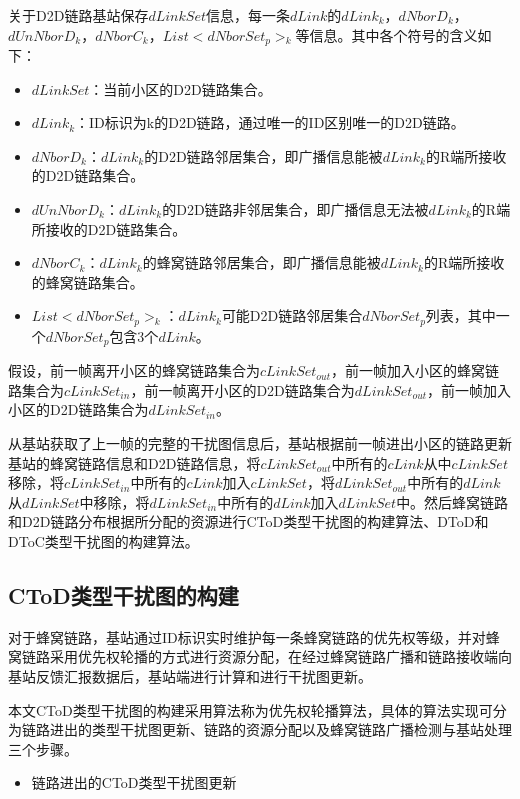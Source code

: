 \documentclass[figurelist,tablelist,algorithmlist,nomlist,masters]{seuthesix}
\begin{document}
	关于D2D链路基站保存$dLinkSet$信息，每一条$dLink$的$dLink_k$，$dNborD_k$，$dUnNborD_k$，$dNborC_k$，$List < dNborSet_{p}{ > _k}$等信息。其中各个符号的含义如下：
	
	\begin{itemize}
		\item $dLinkSet$：当前小区的D2D链路集合。
		\item $dLink_k$：ID标识为k的D2D链路，通过唯一的ID区别唯一的D2D链路。
		\item $dNborD_k$：$dLink_k$的D2D链路邻居集合，即广播信息能被$dLink_k$的R端所接收的D2D链路集合。
		\item $dUnNborD_k$：$dLink_k$的D2D链路非邻居集合，即广播信息无法被$dLink_k$的R端所接收的D2D链路集合。
		\item $dNborC_k$：$dLink_k$的蜂窝链路邻居集合，即广播信息能被$dLink_k$的R端所接收的蜂窝链路集合。
		\item $List < dNborSet_{p}{ > _k}$：$dLink_k$可能D2D链路邻居集合$dNborSet_{p}$列表，其中一个$dNborSet_{p}$包含3个$dLink$。
	\end{itemize}
	
	假设，前一帧离开小区的蜂窝链路集合为$cLinkSet_{out}$，前一帧加入小区的蜂窝链路集合为$cLinkSet_{in}$，前一帧离开小区的D2D链路集合为$dLinkSet_{out}$，前一帧加入小区的D2D链路集合为$dLinkSet_{in}$。
	
	从基站获取了上一帧的完整的干扰图信息后，基站根据前一帧进出小区的链路更新基站的蜂窝链路信息和D2D链路信息，将$cLinkSet_{out}$中所有的$cLink$从中$cLinkSet$移除，将$cLinkSet_{in}$中所有的$cLink$加入$cLinkSet$，将$dLinkSet_{out}$中所有的$dLink$从$dLinkSet$中移除，将$dLinkSet_{in}$中所有的$dLink$加入$dLinkSet$中。然后蜂窝链路和D2D链路分布根据所分配的资源进行CToD类型干扰图的构建算法、DToD和DToC类型干扰图的构建算法。
	
	\subsection{CToD类型干扰图的构建}
	
	对于蜂窝链路，基站通过ID标识实时维护每一条蜂窝链路的优先权等级，并对蜂窝链路采用优先权轮播的方式进行资源分配，在经过蜂窝链路广播和链路接收端向基站反馈汇报数据后，基站端进行计算和进行干扰图更新。
	
	本文CToD类型干扰图的构建采用算法称为优先权轮播算法，具体的算法实现可分为链路进出的类型干扰图更新、链路的资源分配以及蜂窝链路广播检测与基站处理三个步骤。
	
	\begin{itemize}
		\item 链路进出的CToD类型干扰图更新
	\end{itemize}
	
\end{document}
